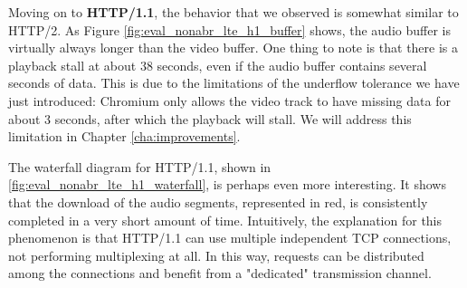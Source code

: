 Moving on to \textbf{HTTP/1.1}, the behavior that we observed is somewhat similar to HTTP/2. As Figure \ref{fig:eval_nonabr_lte_h1_buffer} shows, the audio buffer is virtually always longer than the video buffer. One thing to note is that there is a playback stall at about 38 seconds, even if the audio buffer contains several seconds of data. This is due to the limitations of the underflow tolerance we have just introduced: Chromium only allows the video track to have missing data for about 3 seconds, after which the playback will stall. We will address this limitation in Chapter \ref{cha:improvements}.

The waterfall diagram for HTTP/1.1, shown in \ref{fig:eval_nonabr_lte_h1_waterfall}, is perhaps even more interesting. It shows that the download of the audio segments, represented in red, is consistently completed in a very short amount of time. Intuitively, the explanation for this phenomenon is that HTTP/1.1 can use multiple independent TCP connections, not performing multiplexing at all. In this way, requests can be distributed among the connections and benefit from a "dedicated" transmission channel.

